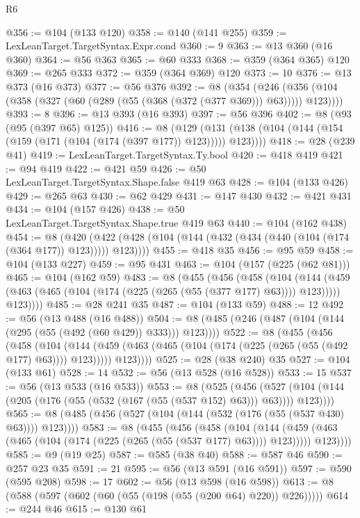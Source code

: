\begin{lexlean}{R6}
\begin{coremodule}
@356 := @104 (@133 @120)
@358 := @140 (@141 @255)
@359 := LexLeanTarget.TargetSyntax.Expr.cond
@360 := 9
@363 := @13 @360 (@16 @360)
@364 := @56 @363
@365 := @60 @333
@368 := @359 (@364 @365) @120
@369 := @265 @333
@372 := @359 (@364 @369) @120
@373 := 10
@376 := @13 @373 (@16 @373)
@377 := @56 @376
@392 := @8
    (@354 (@246 (@356 (@104 (@358 (@327 (@60 (@289 (@55 (@368 (@372 (@377 @369))) @63))))) @123))))
@393 := 8
@396 := @13 @393 (@16 @393)
@397 := @56 @396
@402 := @8 (@93 (@95 (@397 @65) @125))
@416 := @8
    (@129 (@131 (@138 (@104 (@144 (@154 (@159 (@171 (@104 (@174 (@397 @177)) @123))))) @123))))
@418 := @28 (@239 @41)
@419 := LexLeanTarget.TargetSyntax.Ty.bool
@420 := @418 @419
@421 := @94 @419
@422 := @421 @59
@426 := @50 LexLeanTarget.TargetSyntax.Shape.false @419 @63
@428 := @104 (@133 @426)
@429 := @265 @63
@430 := @62 @429
@431 := @147 @430
@432 := @421 @431
@434 := @104 (@157 @426)
@438 := @50 LexLeanTarget.TargetSyntax.Shape.true @419 @63
@440 := @104 (@162 @438)
@454 := @8
    (@420 (@422 (@428 (@104 (@144 (@432 (@434 (@440 (@104 (@174 (@364 @177)) @123))))) @123))))
@455 := @418 @35
@456 := @95 @59
@458 := @104 (@133 @227)
@459 := @95 @431
@463 := @104 (@157 (@225 (@62 @81)))
@465 := @104 (@162 @59)
@483 := @8
    (@455
      (@456
        (@458
          (@104
            (@144 (@459 (@463 (@465 (@104 (@174 (@225 (@265 (@55 (@377 @177) @63)))) @123)))))
            @123))))
@485 := @28 @241 @35
@487 := @104 (@133 @59)
@488 := 12
@492 := @56 (@13 @488 (@16 @488))
@504 := @8 (@485 (@246 (@487 (@104 (@144 (@295 (@55 (@492 (@60 @429)) @333))) @123))))
@522 := @8
    (@455
      (@456
        (@458
          (@104
            (@144 (@459 (@463 (@465 (@104 (@174 (@225 (@265 (@55 (@492 @177) @63)))) @123)))))
            @123))))
@525 := @28 (@38 @240) @35
@527 := @104 (@133 @61)
@528 := 14
@532 := @56 (@13 @528 (@16 @528))
@533 := 15
@537 := @56 (@13 @533 (@16 @533))
@553 := @8
    (@525
      (@456 (@527 (@104 (@144 (@205 (@176 (@55 (@532 (@167 (@55 (@537 @152) @63))) @63)))) @123))))
@565 := @8 (@485 (@456 (@527 (@104 (@144 (@532 (@176 (@55 (@537 @430) @63)))) @123))))
@583 := @8
    (@455
      (@456
        (@458
          (@104
            (@144 (@459 (@463 (@465 (@104 (@174 (@225 (@265 (@55 (@537 @177) @63)))) @123)))))
            @123))))
@585 := @9 (@19 @25)
@587 := @585 (@38 @40)
@588 := @587 @46
@590 := @257 @23 @35
@591 := 21
@595 := @56 (@13 @591 (@16 @591))
@597 := @590 (@595 @208)
@598 := 17
@602 := @56 (@13 @598 (@16 @598))
@613 := @8 (@588 (@597 (@602 (@60 (@55 (@198 (@55 (@200 @64) @220)) @226)))))
@614 := @244 @46
@615 := @130 @61

\end{coremodule}
\end{lexlean}
